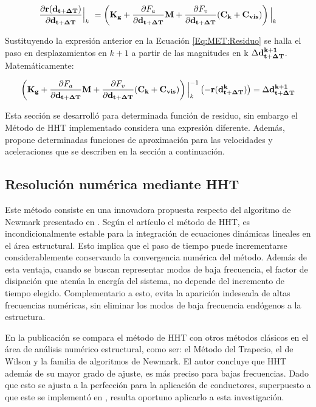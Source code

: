 \begin{equation}\label{Eq:PRE:DerivadaResiduo}
\frac{\partial  \bf{r}(\bf{d}_{t+\Delta T})}{\partial \bf{d}_{t+\Delta T}}\Big|_k~
= \left (\bf{K}_g+\frac{\partial\text{$ F_a$}}{\partial \bf{{d}}_{t+\Delta T}}\bf{M} + \frac{\partial\text{$ F_v$}}{\partial \bf{{d}}_{t+\Delta T}}(\bf{C}_k+\bf{C}_{vis}) \right)\Big|_k
\end{equation}

Sustituyendo la expresión anterior en la Ecuación \eqref{Eq:MET:Residuo} se halla el paso en desplazamientos en $k+1$ a partir de las magnitudes en k $\Delta \bf{d}^{k+1}_{t+\Delta T}$. Matemáticamente:

\begin{equation}\label{Eq:Pre:Incremento}
\left (\bf{K}_g+\frac{\partial\text{$ F_a$}}{\partial \bf{{d}}_{t+\Delta T}}\bf{M} + \frac{\partial\text{$ F_v$}}{\partial \bf{{d}}_{t+\Delta T}}(\bf{C}_k+\bf{C}_{vis} )  \right)\Big|_k^{-1} \left(-\bf{r}(\bf{d}^k_{t+\Delta T})\right)=  \Delta\bf{d}^{k+1}_{t+\Delta T}
\end{equation}

Esta sección se desarrolló para determinada función de residuo, sin embargo el Método de HHT implementado considera una expresión diferente. Además, propone determinadas funciones de aproximación para las velocidades y aceleraciones que se describen en la sección a continuación. 


\subsection{Resolución numérica mediante HHT}\label{Sec:MET:HHT}
Este método consiste en una innovadora propuesta respecto del algoritmo de Newmark presentado en \citep{newmark1959method}. Según el artículo \citep{hilber1977improved} el método de HHT, es incondicionalmente estable para la integración de ecuaciones dinámicas lineales en el área estructural. Esto implica que el paso de tiempo puede incrementarse considerablemente conservando la convergencia numérica del método. Además de esta ventaja, cuando se buscan representar modos de baja frecuencia, el factor de disipación que atenúa la energía del sistema, no depende del incremento de tiempo elegido. Complementario a esto, evita la aparición indeseada de altas frecuencias numéricas, sin eliminar los modos de baja frecuencia endógenos a la estructura. 

En la publicación \citep{hilber1977improved} se compara el método de HHT con otros métodos clásicos en el área de análisis numérico estructural, como ser: el Método del Trapecio, el de Wilson y la familia de algoritmos de Newmark. El autor concluye que HHT además de su mayor grado de ajuste, es más preciso para bajas frecuencias. Dado que esto se ajusta a la perfección para la aplicación de conductores, superpuesto a que este se implementó en \citep{Le2014}, resulta oportuno aplicarlo a esta investigación.

